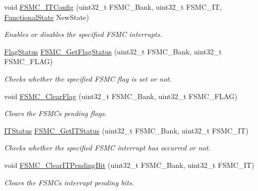 \begin{DoxyCompactItemize}
void \hyperlink{group___f_s_m_c___private___functions_ga217027ae3cd213b9076b6a1be197064c}{F\+S\+M\+C\+\_\+\+I\+T\+Config} (uint32\+\_\+t F\+S\+M\+C\+\_\+\+Bank, uint32\+\_\+t F\+S\+M\+C\+\_\+\+IT, \hyperlink{group___exported__types_gac9a7e9a35d2513ec15c3b537aaa4fba1}{Functional\+State} New\+State)
\begin{DoxyCompactList}\small\item\em Enables or disables the specified F\+S\+MC interrupts. \end{DoxyCompactList}\item 
\hyperlink{group___exported__types_ga89136caac2e14c55151f527ac02daaff}{Flag\+Status} \hyperlink{group___f_s_m_c___private___functions_gae00355115b078f483f0771057bb849c4}{F\+S\+M\+C\+\_\+\+Get\+Flag\+Status} (uint32\+\_\+t F\+S\+M\+C\+\_\+\+Bank, uint32\+\_\+t F\+S\+M\+C\+\_\+\+F\+L\+AG)
\begin{DoxyCompactList}\small\item\em Checks whether the specified F\+S\+MC flag is set or not. \end{DoxyCompactList}\item 
void \hyperlink{group___f_s_m_c___private___functions_ga697618f2de0ad9a8a82461ddbebd5264}{F\+S\+M\+C\+\_\+\+Clear\+Flag} (uint32\+\_\+t F\+S\+M\+C\+\_\+\+Bank, uint32\+\_\+t F\+S\+M\+C\+\_\+\+F\+L\+AG)
\begin{DoxyCompactList}\small\item\em Clears the F\+S\+MC\textquotesingle{}s pending flags. \end{DoxyCompactList}\item 
\hyperlink{group___exported__types_gaacbd7ed539db0aacd973a0f6eca34074}{I\+T\+Status} \hyperlink{group___f_s_m_c___private___functions_ga7fce9ca889d33cd8b8b7413875dd4d73}{F\+S\+M\+C\+\_\+\+Get\+I\+T\+Status} (uint32\+\_\+t F\+S\+M\+C\+\_\+\+Bank, uint32\+\_\+t F\+S\+M\+C\+\_\+\+IT)
\begin{DoxyCompactList}\small\item\em Checks whether the specified F\+S\+MC interrupt has occurred or not. \end{DoxyCompactList}\item 
void \hyperlink{group___f_s_m_c___private___functions_gad9387e7674b8a376256a3378649e004e}{F\+S\+M\+C\+\_\+\+Clear\+I\+T\+Pending\+Bit} (uint32\+\_\+t F\+S\+M\+C\+\_\+\+Bank, uint32\+\_\+t F\+S\+M\+C\+\_\+\+IT)
\begin{DoxyCompactList}\small\item\em Clears the F\+S\+MC\textquotesingle{}s interrupt pending bits. \end{DoxyCompactList}\end{DoxyCompactItemize}


